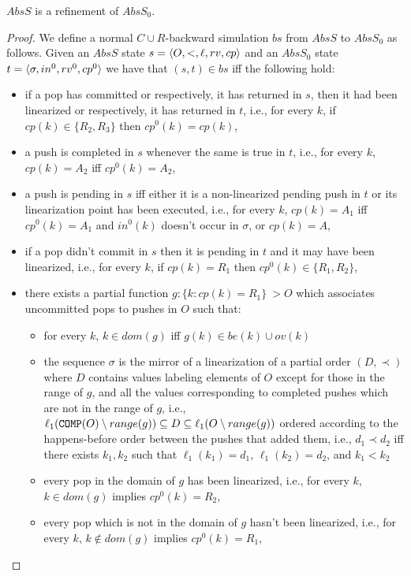 \begin{lemma} 
$AbsS$ is a refinement of $AbsS_0$.
\end{lemma}
\begin{proof}
We define a normal $C\cup R$-backward simulation $bs$ from $AbsS$ to $AbsS_0$ as follows. Given an $AbsS$ state $s=\langle {O,<,\ell,rv,cp} \rangle$ and an $AbsS_0$ state $t=\langle {\sigma,in^0,rv^0,cp^0} \rangle$ we have that $(s,t)\in bs$ iff the following hold:
\begin{itemize}
	\item if a pop has committed or respectively, it has returned in $s$, then it had been linearized or respectively, it has returned in $t$, i.e., for every $k$, if $cp(k)\in\{R_2,R_3\}$ then $cp^0(k)=cp(k)$,
	\item a push is completed in $s$ whenever the same is true in $t$, i.e., for every $k$, $cp(k)=A_2$ iff $cp^0(k)=A_2$,
	\item a push is pending in $s$ iff either it is a non-linearized pending push in $t$ or its linearization point has been executed, i.e., for every $k$, $cp(k)=A_1$ iff $cp^0(k)=A_1$ and $in^0(k)$ doesn't occur in $\sigma$, or $cp(k)=A$,
	\item if a pop didn't commit in $s$ then it is pending in $t$ and it may have been linearized, i.e., for every $k$, if $cp(k)=R_1$ then $cp^0(k)\in \{R_1,R_2\}$,
	\item there exists a partial function $g: \{k: cp(k)=R_1\} ~> O$ which associates uncommitted pops to pushes in $O$ such that:
	\begin{itemize}
		\item for every $k$, $k\in dom(g)$ iff $g(k)\in be(k)\cup ov(k)$
		\item  the sequence $\sigma$ is the mirror of a linearization of a partial order $(D,\prec)$ where $D$ contains values labeling elements of $O$ except for those in the range of $g$, and all the values corresponding to completed pushes which are not in the range of $g$, i.e., $\ell_1({\tt COMP}(O)\setminus range(g))\subseteq D\subseteq \ell_1(O\setminus range(g))$ ordered according to the happens-before order between the pushes that added them, i.e., $d_1\prec d_2$ if{f} there exists $k_1,k_2$ such that $\ell_1(k_1)=d_1$, $\ell_1(k_2)=d_2$, and $k_1 < k_2$
		\item every pop in the domain of $g$ has been linearized, i.e., for every $k$, $k\in dom(g)$ implies $cp^0(k)=R_2$,
		\item every pop which is not in the domain of $g$ hasn't been linearized, i.e., for every $k$, $k\not\in dom(g)$ implies $cp^0(k)=R_1$,

\end{itemize}
\end{itemize}
\end{proof}

